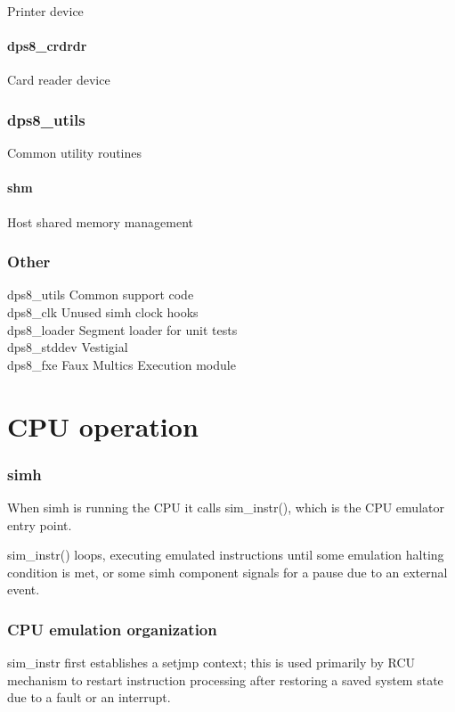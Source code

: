 \documentclass[notitlepage]{report}
\begin{document}
Printer device

\subsection{dps8\_crdrdr}

Card reader device

\section{dps8\_utils}

Common utility routines

\subsection{shm}

Host shared memory management

\section{Other}

dps8\_utils Common support code \\
dps8\_clk  Unused simh clock hooks \\
dps8\_loader Segment loader for unit tests \\
dps8\_stddev Vestigial \\
dps8\_fxe Faux Multics Execution module

\part{CPU operation}

\section{simh}

When simh is running the CPU it calls sim\_instr(), which is the CPU emulator entry point.

sim\_instr() loops, executing emulated instructions until some emulation halting condition is met, or some simh component signals for a pause due to an external
event.

\section{CPU emulation organization}

sim\_instr first establishes a setjmp context; this is used primarily by RCU 
mechanism to restart instruction processing after restoring a saved system
state due to a fault or an interrupt.
\end{document}
